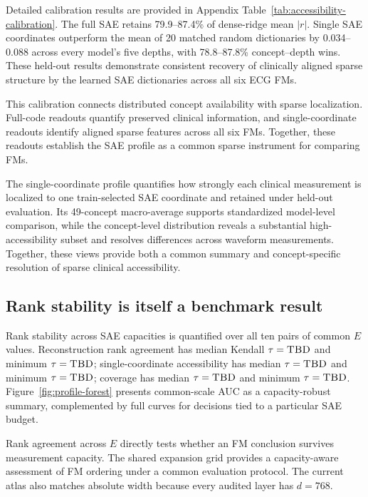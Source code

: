 Detailed calibration results are provided in Appendix Table~\ref{tab:accessibility-calibration}. The full SAE retains 79.9--87.4\% of dense-ridge mean $|r|$. Single SAE coordinates outperform the mean of 20 matched random dictionaries by 0.034--0.088 across every model's five depths, with 78.8--87.8\% concept--depth wins. These held-out results demonstrate consistent recovery of clinically aligned sparse structure by the learned SAE dictionaries across all six ECG FMs.

This calibration connects distributed concept availability with sparse localization. Full-code readouts quantify preserved clinical information, and single-coordinate readouts identify aligned sparse features across all six FMs. Together, these readouts establish the SAE profile as a common sparse instrument for comparing FMs.

The single-coordinate profile quantifies how strongly each clinical measurement is localized to one train-selected SAE coordinate and retained under held-out evaluation. Its 49-concept macro-average supports standardized model-level comparison, while the concept-level distribution reveals a substantial high-accessibility subset and resolves differences across waveform measurements. Together, these views provide both a common summary and concept-specific resolution of sparse clinical accessibility.

\subsection{Rank stability is itself a benchmark result}

Rank stability across SAE capacities is quantified over all ten pairs of common $E$ values. Reconstruction rank agreement has median Kendall $\tau=\textsc{TBD}$ and minimum $\tau=\textsc{TBD}$; single-coordinate accessibility has median $\tau=\textsc{TBD}$ and minimum $\tau=\textsc{TBD}$; coverage has median $\tau=\textsc{TBD}$ and minimum $\tau=\textsc{TBD}$. Figure~\ref{fig:profile-forest} presents common-scale AUC as a capacity-robust summary, complemented by full curves for decisions tied to a particular SAE budget.

Rank agreement across $E$ directly tests whether an FM conclusion survives measurement capacity. The shared expansion grid provides a capacity-aware assessment of FM ordering under a common evaluation protocol. The current atlas also matches absolute width because every audited layer has $d=768$.

